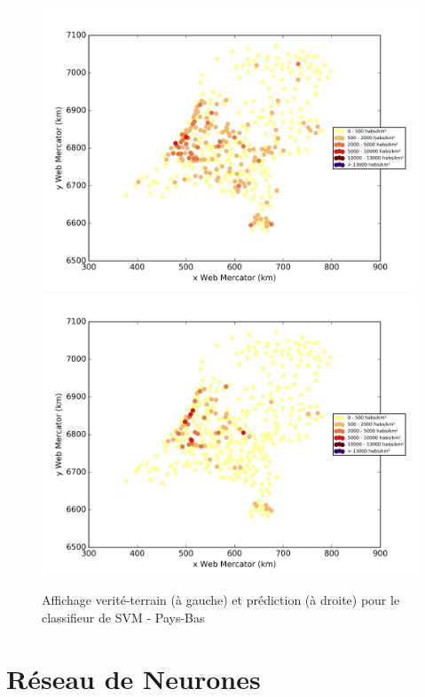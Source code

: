 \documentclass{book}
\begin{document}
\begin{figure}[H]
\centerline{
\includegraphics[scale=0.5]{../../data/Pays-Bas/test/Support_Vector_Gaussian_Classification/Support_Vector_Gaussian_Classification/density_ground_truth.png}
\includegraphics[scale=0.5]{../../data/Pays-Bas/test/Support_Vector_Gaussian_Classification/Support_Vector_Gaussian_Classification/density_classification.png}
}
\caption{Affichage verité-terrain (à gauche) et prédiction (à droite) pour le classifieur de SVM - Pays-Bas}
\label{svm_carte_pays-bas}
\end{figure}


\section{Réseau de Neurones}
\end{document}
